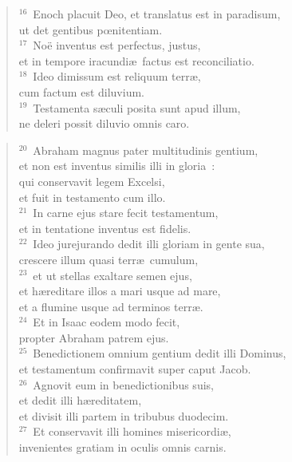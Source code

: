\begin{flushleft}\begin{verse}${}^{16}$~Enoch placuit Deo, et translatus est in paradisum,\\ ut det gentibus pœnitentiam.\\
${}^{17}$~No\"e inventus est perfectus, justus,\\ et in tempore iracundi\ae\ factus est reconciliatio.\\
${}^{18}$~Ideo dimissum est reliquum terr\ae ,\\ cum factum est diluvium.\\
${}^{19}$~Testamenta s\ae culi posita sunt apud illum,\\ ne deleri possit diluvio omnis caro.\end{verse}\end{flushleft}


\begin{flushleft}\begin{verse}${}^{20}$~Abraham magnus pater multitudinis gentium,\\ et non est inventus similis illi in gloria~:\\ qui conservavit legem Excelsi,\\ et fuit in testamento cum illo.\\
${}^{21}$~In carne ejus stare fecit testamentum,\\ et in tentatione inventus est fidelis.\\
${}^{22}$~Ideo jurejurando dedit illi gloriam in gente sua,\\ crescere illum quasi terr\ae\ cumulum,\\
${}^{23}$~et ut stellas exaltare semen ejus,\\ et h\ae reditare illos a mari usque ad mare,\\ et a flumine usque ad terminos terr\ae .\\
${}^{24}$~Et in Isaac eodem modo fecit,\\ propter Abraham patrem ejus.\\
${}^{25}$~Benedictionem omnium gentium dedit illi Dominus,\\ et testamentum confirmavit super caput Jacob.\\
${}^{26}$~Agnovit eum in benedictionibus suis,\\ et dedit illi h\ae reditatem,\\ et divisit illi partem in tribubus duodecim.\\
${}^{27}$~Et conservavit illi homines misericordi\ae ,\\ invenientes gratiam in oculis omnis carnis.\end{verse}\end{flushleft}


